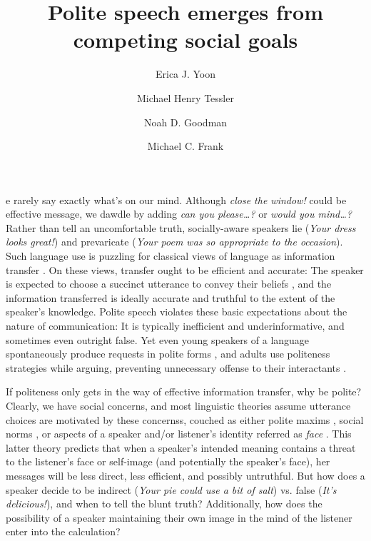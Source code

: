 \documentclass[9pt,twocolumn,twoside,lineno]{main_class_file}
\title{Polite speech emerges from competing social goals}
\author[a,1,2]{Erica J. Yoon}
\author[a,1]{ Michael Henry Tessler}
\author[a]{Noah D. Goodman}
\author[a]{Michael C. Frank}
\affil[a]{Department of Psychology, Stanford University}
\begin{document}
\maketitle
\thispagestyle{firststyle}


e rarely say exactly what's on our mind. 
Although \emph{close the window!} could be effective message, we dawdle by adding \emph{can you please\ldots{}?}
or \emph{would you mind\ldots{}?} 
Rather than tell an uncomfortable truth, socially-aware speakers lie (\emph{Your dress looks great!}) and
prevaricate (\emph{Your poem was so appropriate to the occasion}).
Such language use is puzzling for classical views of language as information transfer \cite{buhler1934, frank2012, jakobson1960, shannon1948}. On these views, transfer ought to be efficient and accurate: The
speaker is expected to choose a succinct utterance to convey their beliefs \cite{grice1975, searle1975}, and the information transferred is ideally accurate and truthful to the extent of the speaker's
knowledge. Polite speech violates these
basic expectations about the nature of communication: It is typically
inefficient and underinformative, and sometimes even outright false. Yet even young speakers of a language spontaneously produce
requests in polite forms \cite{axia1985, clark1980}, and adults use politeness strategies while arguing,
preventing unnecessary offense to their interactants \cite{holtgraves1997}.

If politeness only gets in the way of effective information transfer, why be polite?
Clearly, we have social concerns, and most linguistic theories assume utterance choices are motivated by these concernss, couched as either polite maxims \cite{leech1983}, social norms \cite{ide1989}, or aspects of a speaker and/or listener's identity referred as \emph{face} \cite{brown1987, goffman1967}.
This latter theory predicts that when a speaker's intended meaning contains a threat to the listener's face or self-image (and potentially the speaker's face), her messages will be less direct, less efficient, and possibly untruthful. 
But how does a speaker decide to be indirect (\emph{Your pie could use a bit of salt}) vs. false (\emph{It's delicious!}), and when to tell the blunt truth?
Additionally, how does the possibility of a speaker maintaining their own image in the mind of the listener enter into the calculation?
\end{document}
